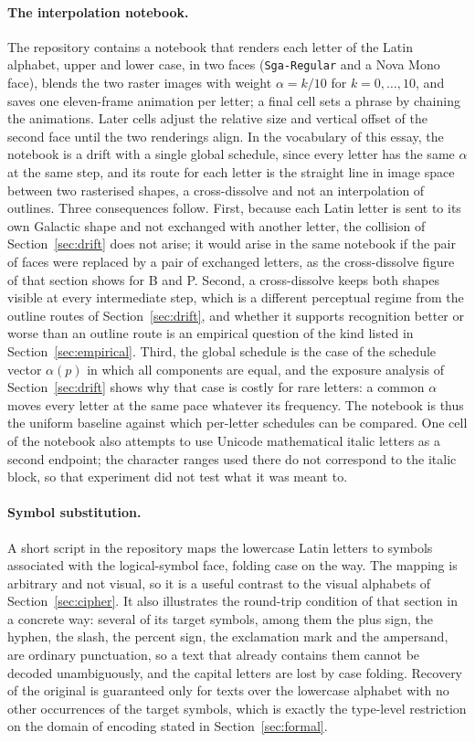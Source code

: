 \paragraph{The interpolation notebook.} The repository contains a notebook that renders each letter of the Latin alphabet, upper and lower case, in two faces (\texttt{Sga-Regular} and a Nova Mono face), blends the two raster images with weight $\alpha=k/10$ for $k=0,\dots,10$, and saves one eleven-frame animation per letter; a final cell sets a phrase by chaining the animations. Later cells adjust the relative size and vertical offset of the second face until the two renderings align. In the vocabulary of this essay, the notebook is a drift with a single global schedule, since every letter has the same $\alpha$ at the same step, and its route for each letter is the straight line in image space between two rasterised shapes, a cross-dissolve and not an interpolation of outlines. Three consequences follow. First, because each Latin letter is sent to its own Galactic shape and not exchanged with another letter, the collision of Section~\ref{sec:drift} does not arise; it would arise in the same notebook if the pair of faces were replaced by a pair of exchanged letters, as the cross-dissolve figure of that section shows for B and P. Second, a cross-dissolve keeps both shapes visible at every intermediate step, which is a different perceptual regime from the outline routes of Section~\ref{sec:drift}, and whether it supports recognition better or worse than an outline route is an empirical question of the kind listed in Section~\ref{sec:empirical}. Third, the global schedule is the case of the schedule vector $\alpha(p)$ in which all components are equal, and the exposure analysis of Section~\ref{sec:drift} shows why that case is costly for rare letters: a common $\alpha$ moves every letter at the same pace whatever its frequency. The notebook is thus the uniform baseline against which per-letter schedules can be compared. One cell of the notebook also attempts to use Unicode mathematical italic letters as a second endpoint; the character ranges used there do not correspond to the italic block, so that experiment did not test what it was meant to.

\paragraph{Symbol substitution.} A short script in the repository maps the lowercase Latin letters to symbols associated with the logical-symbol face, folding case on the way. The mapping is arbitrary and not visual, so it is a useful contrast to the visual alphabets of Section~\ref{sec:cipher}. It also illustrates the round-trip condition of that section in a concrete way: several of its target symbols, among them the plus sign, the hyphen, the slash, the percent sign, the exclamation mark and the ampersand, are ordinary punctuation, so a text that already contains them cannot be decoded unambiguously, and the capital letters are lost by case folding. Recovery of the original is guaranteed only for texts over the lowercase alphabet with no other occurrences of the target symbols, which is exactly the type-level restriction on the domain of encoding stated in Section~\ref{sec:formal}.

